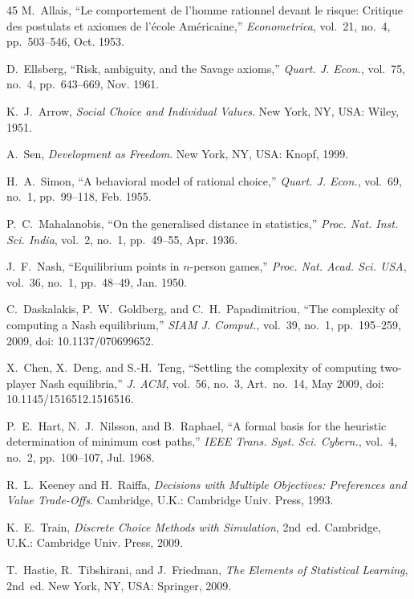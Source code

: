 \documentclass[journal]{IEEEtran}
\begin{document}
\begin{thebibliography}{45}
M.~Allais, ``Le comportement de l'homme rationnel devant le risque: Critique des postulats et axiomes de l'\'{e}cole Am\'{e}ricaine,''
\emph{Econometrica}, vol.~21, no.~4, pp.~503--546, Oct. 1953.

D.~Ellsberg, ``Risk, ambiguity, and the Savage axioms,''
\emph{Quart. J. Econ.}, vol.~75, no.~4, pp.~643--669, Nov. 1961.

K.~J.~Arrow, \emph{Social Choice and Individual Values}.
New York, NY, USA: Wiley, 1951.

A.~Sen, \emph{Development as Freedom}.
New York, NY, USA: Knopf, 1999.

H.~A.~Simon, ``A behavioral model of rational choice,''
\emph{Quart. J. Econ.}, vol.~69, no.~1, pp.~99--118, Feb. 1955.

P.~C.~Mahalanobis, ``On the generalised distance in statistics,''
\emph{Proc. Nat. Inst. Sci. India}, vol.~2, no.~1, pp.~49--55, Apr. 1936.

J.~F.~Nash, ``Equilibrium points in $n$-person games,''
\emph{Proc. Nat. Acad. Sci. USA}, vol.~36, no.~1, pp.~48--49, Jan. 1950.

C.~Daskalakis, P.~W.~Goldberg, and C.~H.~Papadimitriou, ``The complexity of computing a Nash equilibrium,''
\emph{SIAM J. Comput.}, vol.~39, no.~1, pp.~195--259, 2009, doi: 10.1137/070699652.

X.~Chen, X.~Deng, and S.-H.~Teng, ``Settling the complexity of computing two-player Nash equilibria,''
\emph{J. ACM}, vol.~56, no.~3, Art.~no.~14, May 2009, doi: 10.1145/1516512.1516516.

P.~E.~Hart, N.~J.~Nilsson, and B.~Raphael, ``A formal basis for the heuristic determination of minimum cost paths,''
\emph{IEEE Trans. Syst. Sci. Cybern.}, vol.~4, no.~2, pp.~100--107, Jul. 1968.

R.~L.~Keeney and H.~Raiffa, \emph{Decisions with Multiple Objectives: Preferences and Value Trade-Offs}.
Cambridge, U.K.: Cambridge Univ. Press, 1993.

K.~E.~Train, \emph{Discrete Choice Methods with Simulation}, 2nd~ed.
Cambridge, U.K.: Cambridge Univ. Press, 2009.

T.~Hastie, R.~Tibshirani, and J.~Friedman, \emph{The Elements of Statistical Learning}, 2nd~ed.
New York, NY, USA: Springer, 2009.


\end{thebibliography}
\end{document}
